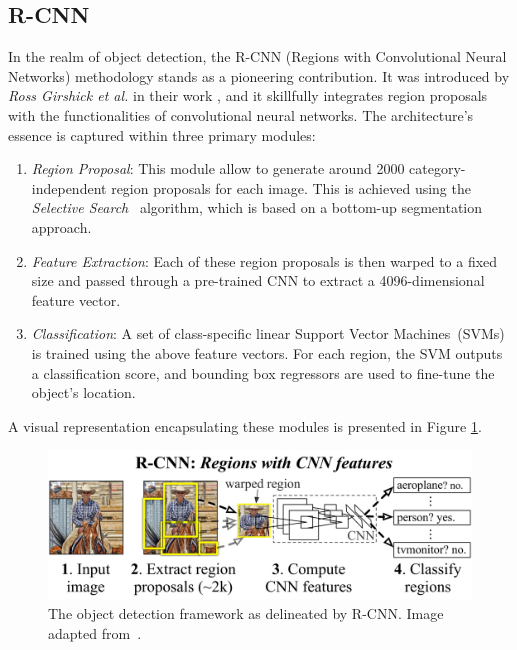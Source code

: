 \subsection{R-CNN}
In the realm of object detection, the R-CNN (Regions with Convolutional Neural Networks) methodology stands as a pioneering contribution. It was introduced by \textit{Ross Girshick et al.} in their work \cite{DBLP:journals/corr/GirshickDDM13}, and it skillfully integrates region proposals with the functionalities of convolutional neural networks. The architecture's essence is captured within three primary modules:
\begin{enumerate}
    \item \textit{Region Proposal}: This module allow to generate around 2000 category-independent region proposals for each image. This  is achieved using the \textit{Selective Search}~\cite{Uijlings2013} algorithm, which is based on a bottom-up segmentation approach.
    \item \textit{Feature Extraction}: Each of these region proposals is then warped to a fixed size and passed through a pre-trained CNN to extract a 4096-dimensional feature vector.
    \item \textit{Classification}: A set of class-specific linear Support Vector Machines~(SVMs) is trained using the above feature vectors. For each region, the SVM outputs a classification score, and bounding box regressors are used to fine-tune the object's location.
\end{enumerate}

A visual representation encapsulating these modules is presented in Figure \ref{fig:rcnn}.

\begin{figure}[htb]
    \centering
    \includegraphics[width=0.7\linewidth]{figures/chapters-imgs/30/rcnn.png}
    \caption{The object detection framework as delineated by R-CNN. Image adapted from~\cite{DBLP:journals/corr/GirshickDDM13}.}
    \label{fig:rcnn}
\end{figure}

